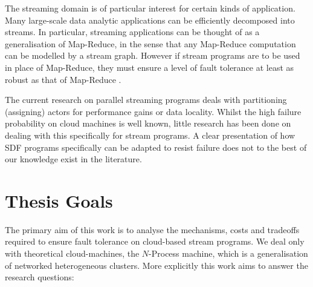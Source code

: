 The streaming domain is of particular interest for certain kinds of application.
Many large-scale data analytic applications can be efficiently decomposed into streams.
In particular, streaming applications can be thought of as a generalisation of Map-Reduce, in the sense that any Map-Reduce computation can be modelled by a stream graph.
However if stream programs are to be used in place of Map-Reduce, they must ensure a level of fault tolerance at least as robust as that of Map-Reduce \cite{dea08}.

The current research on parallel streaming programs deals with partitioning (assigning) actors for performance gains or data locality.
Whilst the high failure probability on cloud machines is well known, little research has been done on dealing with this specifically for stream programs.
A clear presentation of how SDF programs specifically can be adapted to resist failure does not to the best of our knowledge exist in the literature.

\section{Thesis Goals}
\label{secInGoal}

The primary aim of this work is to analyse the mechanisms, costs and tradeoffs required to ensure fault tolerance on cloud-based stream programs.
We deal only with theoretical cloud-machines, the $N$-Process machine, which is a generalisation of networked heterogeneous clusters.
More explicitly this work aims to answer the research questions:

